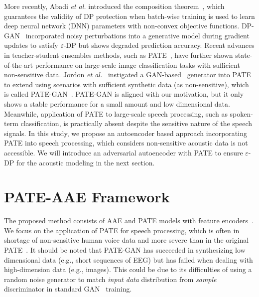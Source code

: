 \documentclass[a4paper]{article}
\begin{document}
More recently,  Abadi \emph{et al.} \cite{abadi2016deep} introduced the composition theorem~\cite{dwork2010boosting}, which guarantees the validity of DP protection when batch-wise training is used to learn deep neural network (DNN) parameters with non-convex objective functions. DP-GAN~\cite{xie2018differentially} incorporated noisy perturbations into a generative model during gradient updates to satisfy $\varepsilon$-DP but shows degraded prediction accuracy. Recent advances in teacher-student ensembles methods, such as PATE~\cite{papernot2016semi, papernot2018scalable}, have further shown state-of-the-art performance on large-scale image classification tasks with sufficient non-sensitive data. Jordon \emph{et al.}~\cite{jordon2019pate} instigated a GAN-based~\cite{goodfellow2014generative} generator into PATE to extend using scenarios with sufficient synthetic data (as non-sensitive), which is called PATE-GAN~\cite{jordon2019pate}. PATE-GAN is aligned with our motivation, but it only shows a stable performance for a small amount and low dimensional data.
Meanwhile, application of PATE to large-scale speech processing, such as spoken-term classification,
is practically absent despite the sensitive nature of the speech signals.
In this study, we propose an autoencoder based approach incorporating PATE into speech processing, which considers non-sensitive acoustic data is not accessible. We will introduce an adversarial autoencoder with PATE to ensure $\varepsilon$-DP for the acoustic modeling in the next section.











\section{PATE-AAE Framework}
The proposed method consists of AAE and PATE models with feature encoders~\cite{chorowski2019unsupervised}. We focus on the application of PATE for speech processing, which is often in shortage of non-sensitive human voice data and more severe than in the original PATE~\cite{papernot2016semi}. It should be noted that PATE-GAN has succeeded in synthesizing low dimensional data (e.g., short sequences of EEG) but has failed when dealing with high-dimension data (e.g., images). This could be due to its difficulties of using a random noise generator to match \emph{input data} distribution from \emph{sample} discriminator in standard GAN~\cite{goodfellow2014generative} training.
\end{document}
